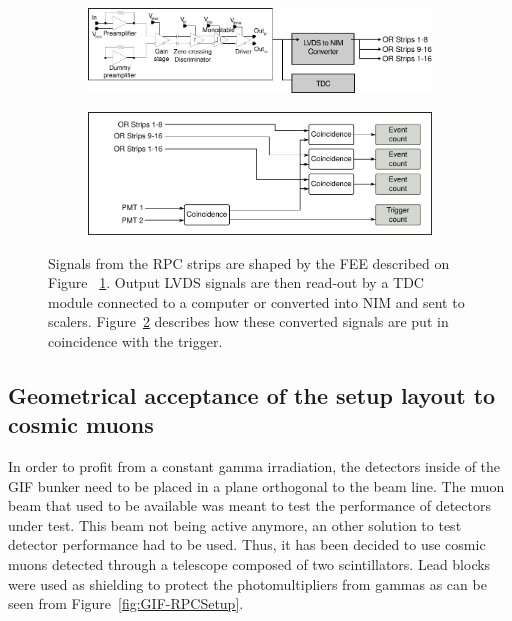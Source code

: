 	\begin{figure}[H]
		\begin{subfigure}{\linewidth}
			\centering
			\includegraphics[width = \plotwidth]{fig/chapt5/pulse-processing.pdf}\\
			\caption{\label{fig:DAQ:A}}
		\end{subfigure}
		\begin{subfigure}{\linewidth}
			\centering
			\includegraphics[width = \plotwidth]{fig/chapt5/pulse-processing-2.pdf}
			\caption{\label{fig:DAQ:B}}
		\end{subfigure}
		\caption{\label{fig:DAQ} Signals from the RPC strips are shaped by the FEE described on Figure ~\ref{fig:DAQ:A}. Output LVDS signals are then read-out by a TDC module connected to a computer or converted into NIM and sent to scalers. Figure~\ref{fig:DAQ:B} describes how these converted signals are put in coincidence with the trigger.}
	\end{figure}
	
	\subsection{Geometrical acceptance of the setup layout to cosmic muons}
	\label{chapt5:ssec:GeoAcc}
				
	In order to profit from a constant gamma irradiation, the detectors inside of the GIF bunker need to be placed in a plane orthogonal to the beam line. The muon beam that used to be available was meant to test the performance of detectors under test. This beam not being active anymore, an other solution to test detector performance had to be used. Thus, it has been decided to use cosmic muons detected through a telescope composed of two scintillators. Lead blocks were used as shielding to protect the photomultipliers from gammas as can be seen from Figure~\ref{fig:GIF-RPCSetup}.
				
